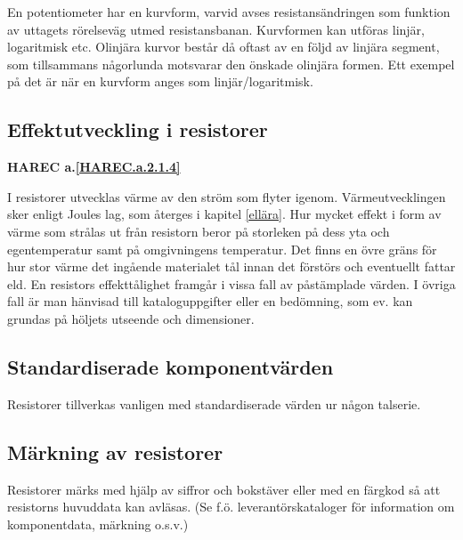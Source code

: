 En potentiometer har en kurvform, varvid avses resistansändringen som funktion
av uttagets rörelseväg utmed resistansbanan. Kurvformen kan utföras linjär,
logaritmisk etc. Olinjära kurvor består då oftast av en följd av linjära
segment, som tillsammans någorlunda motsvarar den önskade olinjära formen. Ett
exempel på det är när en kurvform anges som linjär/logaritmisk.

\subsection{Effektutveckling i resistorer}
\textbf{HAREC a.\ref{HAREC.a.2.1.4}\label{myHAREC.a.2.1.4}}

I resistorer utvecklas värme av den ström som flyter igenom. Värmeutvecklingen
sker enligt Joules lag, som återges i kapitel \ref{ellära}. Hur mycket effekt i form av
värme som strålas ut från resistorn beror på storleken på dess yta och
egentemperatur samt på omgivningens temperatur. Det finns en övre gräns för hur
stor värme det ingående materialet tål innan det förstörs och eventuellt fattar
eld. En resistors effekttålighet framgår i vissa fall av påstämplade värden.
I övriga fall är man hänvisad till kataloguppgifter eller en bedömning, som ev.
kan grundas på höljets utseende och dimensioner.

\subsection{Standardiserade komponentvärden}

Resistorer tillverkas vanligen med standardiserade värden ur någon talserie.

\subsection{Märkning av resistorer}

Resistorer märks med hjälp av siffror och bokstäver eller med en färgkod så att
resistorns huvuddata kan avläsas.
(Se f.ö. leverantörskataloger för information om komponentdata, märkning o.s.v.)
